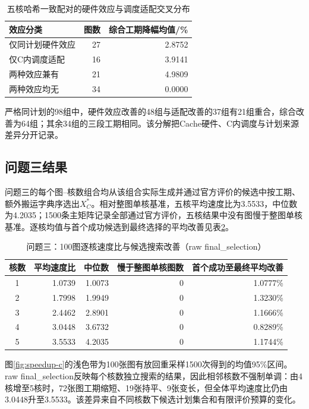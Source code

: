 \begin{table}[H]\centering\small
\caption{五核哈希一致配对的硬件效应与调度适配交叉分布}
\label{tab:c-effect-cross}
\begin{tabular}{lrr}\toprule
效应分类 & 图数 & 综合工期降幅均值/\%\\\midrule
仅同计划硬件效应 & 27 & 2.8752\\
仅C内调度适配 & 16 & 3.9141\\
两种效应兼有 & 21 & 4.9809\\
两种效应均无 & 34 & 0.0000\\\bottomrule
\end{tabular}
\end{table}
严格同计划的98组中，硬件效应改善的48组与适配改善的37组有21组重合，综合改善为64组；其余34组的三段工期相同。该分解把Cache硬件、C内调度与计划来源差异分开记录。

\subsection{问题三结果}
问题三的每个图--核数组合均从该组合实际生成并通过官方评价的候选中按工期、额外搬运字典序选出$X_C^*$。相对整图单核基准，五核平均速度比为3.5533，中位数为4.2035；1500条主矩阵记录全部通过官方评价，五核结果中没有图慢于整图单核基准。逐核均值与首个成功候选到最终选择的平均改善见表\ref{tab:c-results}。
\begin{table}[H]\centering\caption{问题三：100图逐核速度比与候选搜索改善（raw final\_selection）}\label{tab:c-results}
\begin{tabular}{crrrr}\toprule
核数 & 平均速度比 & 中位数 & 慢于整图单核图数 & 首个成功至最终平均改善\\\midrule
1 & 1.0739 & 1.0073 & 0 & 1.0777\%\\
2 & 1.7998 & 1.9949 & 0 & 1.3230\%\\
3 & 2.4462 & 2.8901 & 0 & 1.1666\%\\
4 & 3.0448 & 3.6732 & 0 & 0.8289\%\\
5 & 3.5533 & 4.2035 & 0 & 1.1744\%\\\bottomrule
\end{tabular}\end{table}

图\ref{fig:speedup-c}的浅色带为100张图有放回重采样1500次得到的均值95\%区间。raw final\_selection反映每个核数独立搜索的结果，因此相邻核数不强制单调：由4核增至5核时，72张图工期缩短、19张持平、9张变长，但全体平均速度比仍由3.0448升至3.5533。该差异来自不同核数下候选计划集合和有限评价预算的变化。

